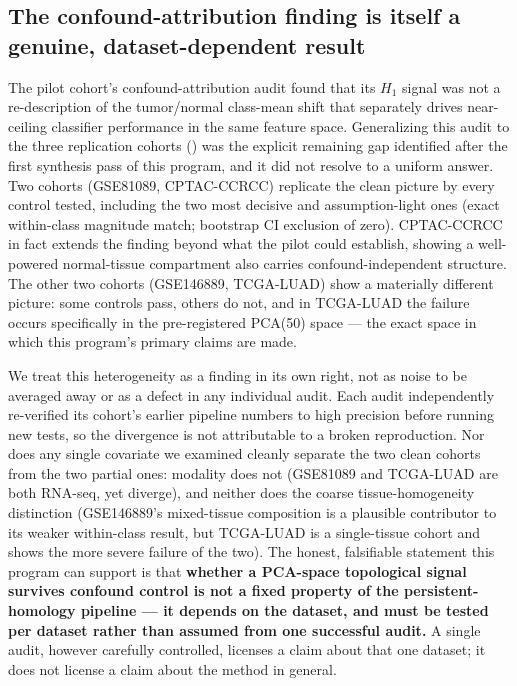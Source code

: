 \subsection{The confound-attribution finding is itself a genuine, dataset-dependent result}

The pilot cohort's confound-attribution audit found that its $H_1$ signal was not a re-description of the
tumor/normal class-mean shift that separately drives near-ceiling classifier performance in the same
feature space. Generalizing this audit to the three replication cohorts ()
was the explicit remaining gap identified after the first synthesis pass of this program, and it did not
resolve to a uniform answer. Two cohorts (GSE81089, CPTAC-CCRCC) replicate the clean picture by every
control tested, including the two most decisive and assumption-light ones (exact within-class magnitude
match; bootstrap CI exclusion of zero). CPTAC-CCRCC in fact extends the finding beyond what the pilot could
establish, showing a well-powered normal-tissue compartment also carries confound-independent structure.
The other two cohorts (GSE146889, TCGA-LUAD) show a materially different picture: some controls pass, others
do not, and in TCGA-LUAD the failure occurs specifically in the pre-registered PCA(50) space --- the exact
space in which this program's primary claims are made.

We treat this heterogeneity as a finding in its own right, not as noise to be averaged away or as a defect
in any individual audit. Each audit independently re-verified its cohort's earlier pipeline numbers to high
precision before running new tests, so the divergence is not attributable to a broken reproduction. Nor
does any single covariate we examined cleanly separate the two clean cohorts from the two partial ones: 
modality does not (GSE81089 and TCGA-LUAD are both RNA-seq, yet diverge), and neither does the coarse
tissue-homogeneity distinction (GSE146889's mixed-tissue composition is a plausible contributor to its
weaker within-class result, but TCGA-LUAD is a single-tissue cohort and shows the more severe failure
of the two). The honest, falsifiable statement this program can support is that \textbf{whether a
PCA-space topological signal survives confound control is not a fixed property of the persistent-homology
pipeline --- it depends on the dataset, and must be tested per dataset rather than assumed from one
successful audit.} A single audit, however carefully controlled, licenses a claim about that one dataset;
it does not license a claim about the method in general.

